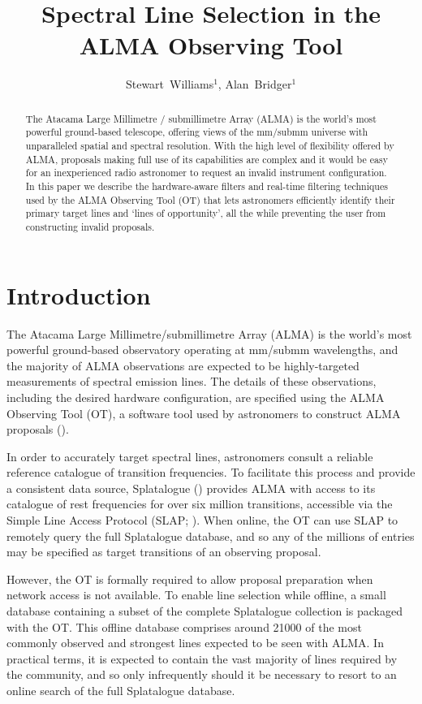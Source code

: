 \documentclass[11pt,twoside]{article}
\begin{document}
\title{Spectral Line Selection in the ALMA Observing Tool}
\author{Stewart~Williams$^1$, Alan~Bridger$^1$}

\begin{abstract}
The Atacama Large Millimetre / submillimetre Array (ALMA) is the world's most powerful ground-based telescope, offering views of the mm/submm universe with unparalleled spatial and spectral resolution. With the high level of flexibility offered by ALMA, proposals making full use of its capabilities are complex and it would be easy for an inexperienced radio astronomer to request an invalid instrument configuration. In this paper we describe the hardware-aware filters and real-time filtering techniques used by the ALMA Observing Tool (OT) that lets astronomers efficiently identify their primary target lines and `lines of opportunity', all the while preventing the user from constructing invalid proposals.
\end{abstract}

\section{Introduction}
\label{sec:introduction}
The Atacama Large Millimetre/submillimetre Array (ALMA) is the world's most powerful ground-based observatory operating at mm/submm wavelengths, and the majority of ALMA observations are expected to be highly-targeted measurements of spectral emission lines. The details of these observations, including the desired hardware configuration, are specified using the ALMA Observing Tool (OT), a software tool used by astronomers to construct ALMA proposals (\cite{bridger_2004}).

In order to accurately target spectral lines, astronomers consult a reliable reference catalogue of transition frequencies. To facilitate this process and provide a consistent data source, Splatalogue (\cite{splatalogue}) provides ALMA with access to its catalogue of rest frequencies for over six million transitions, accessible via the Simple Line Access Protocol (SLAP; \cite{SLAP}). When online, the OT can use SLAP to remotely query the full Splatalogue database, and so any of the millions of entries may be specified as target transitions of an observing proposal.

However, the OT is formally required to allow proposal preparation when network access is not available. To enable line selection while offline, a small database containing a subset of the complete Splatalogue collection is packaged with the OT. This offline database comprises around 21000 of the most commonly observed and strongest lines expected to be seen with ALMA. In practical terms, it is expected to contain the vast majority of lines required by the community, and so only infrequently should it be necessary to resort to an online search of the full Splatalogue database. 
\end{document}
